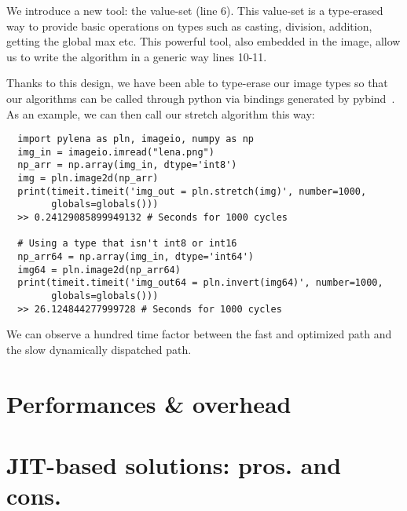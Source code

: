 We introduce a new tool: the value-set (line 6). This value-set is a type-erased way to provide basic operations on
types such as casting, division, addition, getting the global max etc. This powerful tool, also embedded in the image,
allow us to write the algorithm in a generic way lines 10-11.

Thanks to this design, we have been able to type-erase our image types so that our algorithms can be called through
python via bindings generated by pybind~\cite{jakob.2017.pybind11}. As an example, we can then call our stretch
algorithm this way:

\begin{verbatim}
  import pylena as pln, imageio, numpy as np
  img_in = imageio.imread("lena.png")
  np_arr = np.array(img_in, dtype='int8')
  img = pln.image2d(np_arr)
  print(timeit.timeit('img_out = pln.stretch(img)', number=1000,
        globals=globals()))
  >> 0.24129085899949132 # Seconds for 1000 cycles

  # Using a type that isn't int8 or int16
  np_arr64 = np.array(img_in, dtype='int64')
  img64 = pln.image2d(np_arr64)
  print(timeit.timeit('img_out64 = pln.invert(img64)', number=1000,
        globals=globals()))
  >> 26.124844277999728 # Seconds for 1000 cycles
\end{verbatim}

We can observe a hundred time factor between the fast and optimized path and the slow dynamically dispatched path.

\section{Performances & overhead}


\section{JIT-based solutions: pros. and cons.}

